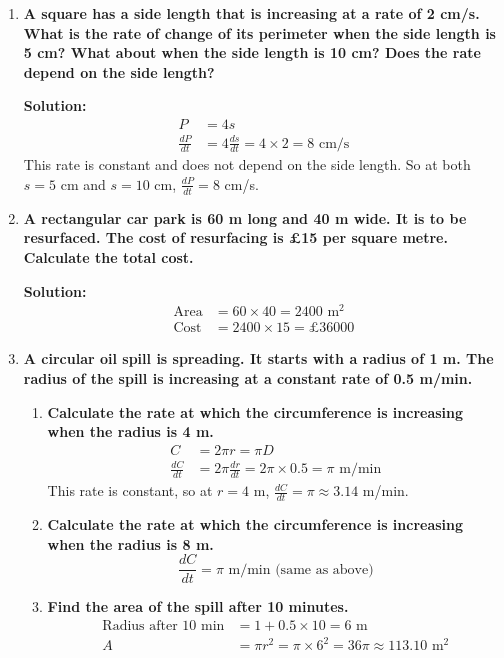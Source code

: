 \documentclass[12pt]{article}
\begin{document}
\begin{enumerate}[resume]
    \item \textbf{A square has a side length that is increasing at a rate of 2 cm/s. What is the rate of change of its perimeter when the side length is 5 cm? What about when the side length is 10 cm? Does the rate depend on the side length?}
    
    \textbf{Solution:}
    \begin{align*}
        P &= 4s \\
        \frac{dP}{dt} &= 4 \frac{ds}{dt} = 4 \times 2 = 8 \text{ cm/s}
    \end{align*}
    This rate is constant and does not depend on the side length. So at both \(s = 5\) cm and \(s = 10\) cm, \(\frac{dP}{dt} = 8\) cm/s.
    
    \item \textbf{A rectangular car park is 60 m long and 40 m wide. It is to be resurfaced. The cost of resurfacing is £15 per square metre. Calculate the total cost.}
    
    \textbf{Solution:}
    \begin{align*}
        \text{Area} &= 60 \times 40 = 2400 \text{ m}^2 \\
        \text{Cost} &= 2400 \times 15 = £36000
    \end{align*}
    
    \item \textbf{A circular oil spill is spreading. It starts with a radius of 1 m. The radius of the spill is increasing at a constant rate of 0.5 m/min.}
    \begin{enumerate}
        \item \textbf{Calculate the rate at which the circumference is increasing when the radius is 4 m.}
        \begin{align*}
            C &= 2\pi r = \pi D \\
            \frac{dC}{dt} &= 2\pi \frac{dr}{dt} = 2\pi \times 0.5 = \pi \text{ m/min}
        \end{align*}
        This rate is constant, so at \(r = 4\) m, \(\frac{dC}{dt} = \pi \approx 3.14\) m/min.
        
        \item \textbf{Calculate the rate at which the circumference is increasing when the radius is 8 m.}
        \[
        \frac{dC}{dt} = \pi \text{ m/min} \text{ (same as above)}
        \]
        
        \item \textbf{Find the area of the spill after 10 minutes.}
        \begin{align*}
            \text{Radius after 10 min} &= 1 + 0.5 \times 10 = 6 \text{ m} \\
            A &= \pi r^2 = \pi \times 6^2 = 36\pi \approx 113.10 \text{ m}^2
        \end{align*}
    \end{enumerate}
    

\end{enumerate}
\end{document}
